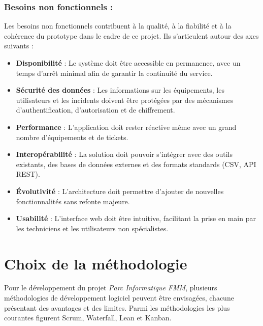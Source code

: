 \subsubsection{Besoins non fonctionnels :}
\label{subsec:besoins_non_fonctionnels}

Les besoins non fonctionnels contribuent à la qualité, à la fiabilité et à la cohérence du prototype dans le cadre de ce projet. Ils s’articulent autour des axes suivants :

\begin{itemize}
    \item \textbf{Disponibilité} : Le système doit être accessible en permanence, avec un temps d’arrêt minimal afin de garantir la continuité du service. \\
    \item \textbf{Sécurité des données} : Les informations sur les équipements, les utilisateurs et les incidents doivent être protégées par des mécanismes d’authentification, d’autorisation et de chiffrement. \\
    \item \textbf{Performance} : L’application doit rester réactive même avec un grand nombre d’équipements et de tickets. \\
    \item \textbf{Interopérabilité} : La solution doit pouvoir s’intégrer avec des outils existants, des bases de données externes et des formats standards (CSV, API REST). \\
    \item \textbf{Évolutivité} : L’architecture doit permettre d’ajouter de nouvelles fonctionnalités sans refonte majeure. \\
    \item \textbf{Usabilité} : L’interface web doit être intuitive, facilitant la prise en main par les techniciens et les utilisateurs non spécialistes. \\
\end{itemize}

\section{Choix de la méthodologie}
\label{sec:choix_methodologie}

Pour le développement du projet \textit{Parc Informatique FMM}, plusieurs méthodologies de développement logiciel peuvent être envisagées, chacune présentant des avantages et des limites. Parmi les méthodologies les plus courantes figurent Scrum, Waterfall, Lean et Kanban.
